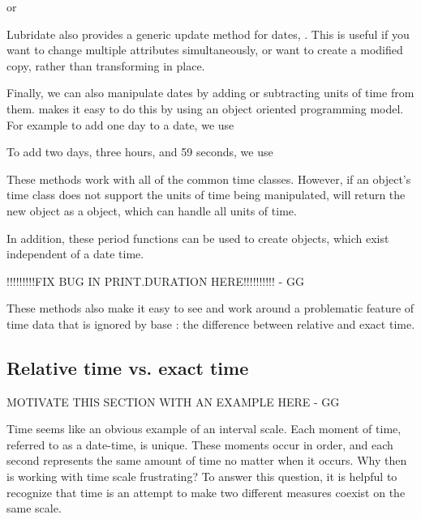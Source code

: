\documentclass[article]{jss}
\begin{document}

or


Lubridate also provides a generic update method for dates, .  This is useful if you want to change multiple attributes simultaneously, or want to create a modified copy, rather than transforming in place.


Finally, we can also manipulate dates by adding or subtracting units of time from them.  makes it easy to do this by using an object oriented programming model. For example to add one day to a date, we use


To add two days, three hours, and 59 seconds, we use


These methods work with all of the common time classes. However, if an object's time class does not support the units of time being manipulated,  will return the new object as a  object, which can handle all units of time.

In addition, these period functions can be used to create  objects, which exist independent of a date time.


!!!!!!!!!FIX BUG IN PRINT.DURATION HERE!!!!!!!!!! - GG

These methods also make it easy to see and work around a problematic feature of time data that is ignored by base : the difference between relative and exact time.


\subsection{Relative time vs. exact time}

MOTIVATE THIS SECTION WITH AN EXAMPLE HERE - GG

Time seems like an obvious example of an interval scale. Each moment of time, referred to as a date-time, is unique.  These moments occur in order, and each second represents the same amount of time no matter when it occurs.  Why then is working with time scale frustrating? To answer this question, it is helpful to recognize that time is an attempt to make two different measures coexist on the same scale. 
\end{document}
